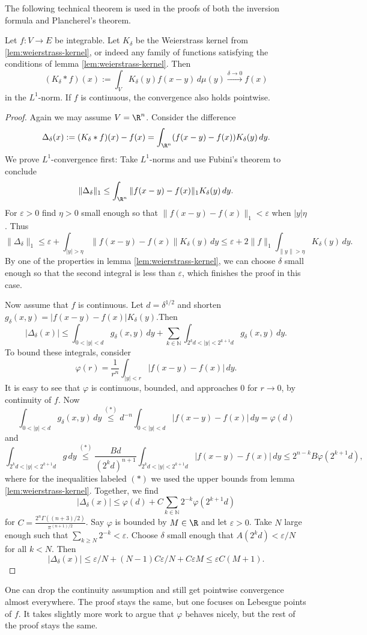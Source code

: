 The following technical theorem is used in the proofs of both the inversion formula and Plancherel's theorem.
\begin{theorem}
\label{thm:kernel-approximation}
\lean{}
Let $f:V\to E$ be integrable. Let $K_\delta$ be the Weierstrass kernel from \ref{lem:weierstrass-kernel},
or indeed any family of functions satisfying the conditions of lemma \ref{lem:weierstrass-kernel}. Then
$$(K_\delta\ast f)(x):=\int_V K_\delta(y)f(x-y)\,d\mu(y)\xrightarrow{\delta\to0}f(x)$$ in the $L^1$-norm.
If $f$ is continuous, the convergence also holds pointwise.
\end{theorem}
\begin{proof}
Again we may assume $V=\R^n$. Consider the difference $$\Delta_\delta(x):=(K_\delta\ast f)(x)-f(x)=
\int_{\R^n}(f(x-y)-f(x))K_\delta(y)\,dy.$$ We prove $L^1$-convergence first:
Take $L^1$-norms and use Fubini's theorem to conclude
$$\|\Delta_\delta\|_1\leq\int_{\R^n}\|f(x-y)-f(x)\|_1K_\delta(y)\,dy.$$ For $\varepsilon>0$ find $\eta>0$
small enough so that $\|f(x-y)-f(x)\|_1<\varepsilon$ when $|y|\eta$. Thus
$$\|\Delta_\delta\|_1\leq\varepsilon+\int_{|y|>\eta}\|f(x-y)-f(x)\|K_\delta(y)\,dy\leq\varepsilon+2\|f\|_1\int_{\|y\|>\eta}K_\delta(y)\,dy.$$
By one of the properties in lemma \ref{lem:weierstrass-kernel}, we can choose $\delta$ small enough so that the second integral
is less than $\varepsilon$, which finishes the proof in this case.

Now assume that $f$ is continuous.
Let $d=\delta^{1/2}$ and shorten $g_\delta(x,y)=|f(x-y)-f(x)|K_\delta(y)$.Then
 $$|\Delta_\delta(x)|\leq\int_{0<|y|<d}g_\delta(x,y)\,dy+\sum_{k\in\mathbb N}\int_{2^kd<|y|<2^{k+1}d}g_\delta(x,y)\,dy.$$
 To bound these integrals, consider
 $$\varphi(r)=\frac1{r^n}\int_{|y|<r}|f(x-y)-f(x)|\,dy.$$
 It is easy to see that $\varphi$ is continuous, bounded, and approaches $0$ for $r\to0$, by continuity of $f$.
 Now $$\int_{0<|y|<d}g_\delta(x,y)\,dy\overset{(\ast)}\leq d^{-n}\int_{0<|y|<d}|f(x-y)-f(x)|\,dy=\varphi(d)$$ and
 $$\int_{2^kd<|y|<2^{k+1}d}g\,dy\overset{(\ast)}\leq
 \frac{Bd}{(2^kd)^{n+1}}\int_{2^kd<|y|<2^{k+1}d}|f(x-y)-f(x)|\,dy\leq2^{n-k}B\varphi(2^{k+1}d),$$
 where for the inequalities labeled $(\ast)$ we used the upper bounds from lemma \ref{lem:weierstrass-kernel}.
 Together, we find
 $$|\Delta_\delta(x)|\leq\varphi(d)+C\sum_{k\in\mathbb N}2^{-k}\varphi(2^{k+1}d)$$ for
 $C=\frac{2^n\Gamma((n+3)/2)}{\pi^{(n+1)/2}}$. Say $\varphi$ is bounded by $M\in\R$ and let $\varepsilon>0$.
 Take $N$ large enough such that $\sum_{k\geq N}2^{-k}<\varepsilon$. Choose $\delta$ small enough that
 $A(2^kd)<\varepsilon/N$ for all $k<N$. Then
 $$|\Delta_\delta(x)|\leq\varepsilon/N+(N-1)C\varepsilon/N+C\varepsilon M\leq \varepsilon C(M+1).$$
\end{proof}
\begin{remark}
  One can drop the continuity assumption and still get pointwise convergence almost everywhere. The proof stays the same,
  but one focuses on Lebesgue points of $f$. It takes slightly more work to argue that $\varphi$ behaves nicely,
  but the rest of the proof stays the same.
\end{remark}

